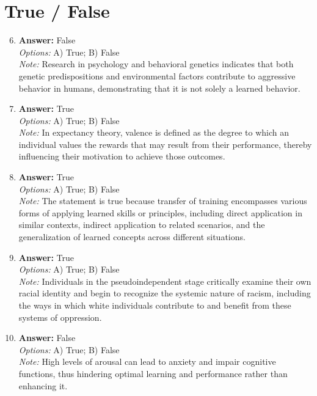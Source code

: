 \documentclass[12pt]{article}
\begin{document}
\section*{True / False}
\begin{enumerate}[label=\arabic*.]
\setcounter{enumi}{5}
\item \textbf{Answer:} False
\\ \textit{Options:} A) True; B) False
\\ \textit{Note:} Research in psychology and behavioral genetics indicates that both genetic predispositions and environmental factors contribute to aggressive behavior in humans, demonstrating that it is not solely a learned behavior.
\item \textbf{Answer:} True
\\ \textit{Options:} A) True; B) False
\\ \textit{Note:} In expectancy theory, valence is defined as the degree to which an individual values the rewards that may result from their performance, thereby influencing their motivation to achieve those outcomes.
\item \textbf{Answer:} True
\\ \textit{Options:} A) True; B) False
\\ \textit{Note:} The statement is true because transfer of training encompasses various forms of applying learned skills or principles, including direct application in similar contexts, indirect application to related scenarios, and the generalization of learned concepts across different situations.
\item \textbf{Answer:} True
\\ \textit{Options:} A) True; B) False
\\ \textit{Note:} Individuals in the pseudoindependent stage critically examine their own racial identity and begin to recognize the systemic nature of racism, including the ways in which white individuals contribute to and benefit from these systems of oppression.
\item \textbf{Answer:} False
\\ \textit{Options:} A) True; B) False
\\ \textit{Note:} High levels of arousal can lead to anxiety and impair cognitive functions, thus hindering optimal learning and performance rather than enhancing it.
\end{enumerate}
\end{document}
